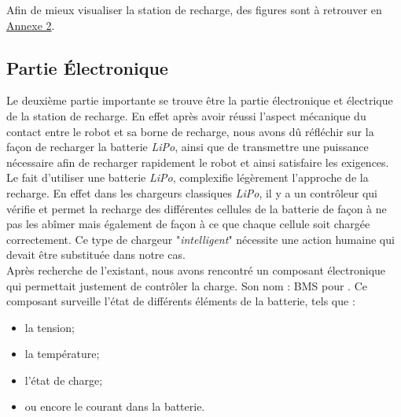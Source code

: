 \documentclass[french]{rapportENSTAB}
\begin{document}
Afin de mieux visualiser la station de recharge, des figures sont à retrouver en \hyperlink{annexe}{Annexe 2}.\\

\subsection{Partie Électronique}
Le deuxième partie importante se trouve être la partie électronique et électrique de la station de recharge. En effet après avoir réussi l'aspect mécanique du contact entre le robot et sa borne de recharge, nous avons dû réfléchir sur la façon de recharger la batterie \textit{LiPo}, ainsi que de transmettre une puissance nécessaire afin de recharger rapidement le robot et ainsi satisfaire les exigences. \\

Le fait d'utiliser une batterie \textit{LiPo}, complexifie légèrement l'approche de la recharge. En effet dans les chargeurs classiques \textit{LiPo}, il y a un contrôleur qui vérifie et permet la recharge des différentes cellules de la batterie de façon à ne pas les abîmer mais également de façon à ce que chaque cellule soit chargée correctement. Ce type de chargeur "\textit{intelligent}" nécessite une action humaine qui devait être substituée dans notre cas.\\
Après recherche de l'existant, nous avons rencontré un composant électronique qui permettait justement de contrôler la charge. Son nom : BMS pour . Ce composant surveille l'état de différents éléments de la batterie, tels que : \begin{itemize}[label=\textbullet, font=\small\color{blue}]
    \item la tension;
    \item la température;
    \item l'état de charge;
    \item ou encore le courant dans la batterie.
\end{itemize}
\\
\end{document}
